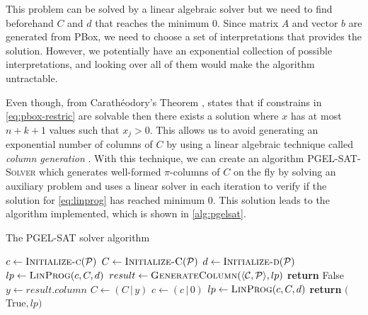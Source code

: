 This problem can be solved by a linear algebraic solver but we need to find beforehand $C$ and $d$ that reaches the minimum 0. Since matrix $A$ and vector $b$ are generated from PBox, we need to choose a set of interpretations that provides the solution. However, we potentially have an exponential collection of possible interpretations, and looking over all of them would make the algorithm untractable. 

Even though, from Carathéodory's Theorem \citep{eckhoff1993helly}, \citet{Fin2020} states that if constrains in \autoref{eq:pbox-restric} are solvable then there exists  a solution where $x$ has at most $n + k + 1$ values such that $x_j > 0$. This allows us to avoid generating an exponential number of columns of $C$ by using a linear algebraic technique called \emph{column generation} \citep{gilmore1961linear,gilmore1963linear}. With this technique, we can create an algorithm \textsc{PGEL-SAT-Solver} which generates well-formed $\pi$-columns of $C$ on the fly by solving an auxiliary problem and uses a linear solver in each iteration to verify if the solution for \autoref{eq:linprog} has reached minimum 0. This solution leads to the algorithm implemented, which is shown in \autoref{alg:pgelsat}.

\begin{algorithm}
	\caption{The PGEL-SAT solver algorithm}
  	\label{alg:pgelsat}
	\begin{algorithmic}[1]
		\State $c \gets \Call{Initialize-c}{\PP}$
		\State $C \gets \Call{Initialize-C}{\PP}$
		\State $d \gets \Call{Initialize-d}{\PP}$
		\Statex
		\State $lp \gets \Call{LinProg}{c, C, d}$
		\Statex
		\State $result \gets \Call{GenerateColumn}{\tuple{\CC, \PP}, lp}$
		\State \textbf{return} False 
		\EndIf
		\Statex
		\State $y \gets result.column$ 
		\State $C \gets ( C \, | \, y) $
		\State $c \gets (c \, | \, 0)$
		\State $lp \gets \Call{LinProg}{c, C, d}$
		\EndWhile
		\Statex
		\State \textbf{return} $($True$, lp)$ 
		\EndFunction
	\end{algorithmic}
\end{algorithm}


